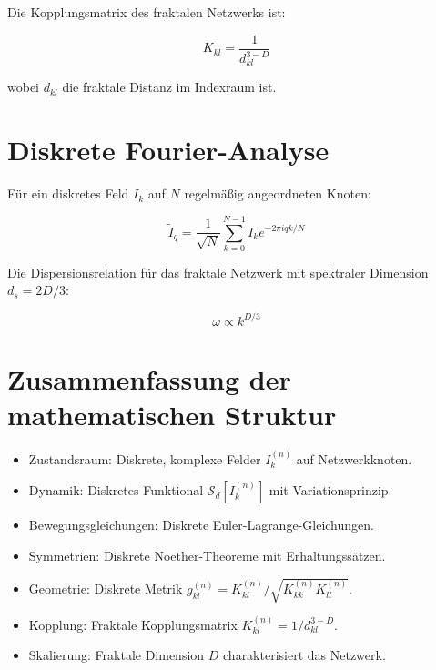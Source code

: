 Die Kopplungsmatrix des fraktalen Netzwerks ist:

\[
K_{kl} = \frac{1}{d_{kl}^{3-D}}
\]

wobei \( d_{kl} \) die fraktale Distanz im Indexraum ist.

\section{Diskrete Fourier-Analyse}

Für ein diskretes Feld \( I_k \) auf \( N \) regelmäßig angeordneten Knoten:

\[
\tilde{I}_q = \frac{1}{\sqrt{N}} \sum_{k=0}^{N-1} I_k e^{-2\pi i q k / N}
\]

Die Dispersionsrelation für das fraktale Netzwerk mit spektraler Dimension \( d_s = 2D/3 \):

\[
\omega \propto k^{D/3}
\]

\section{Zusammenfassung der mathematischen Struktur}

\begin{itemize}
\item Zustandsraum: Diskrete, komplexe Felder \( I_k^{(n)} \) auf Netzwerkknoten.
\item Dynamik: Diskretes Funktional \( \mathcal{S}_d[I_k^{(n)}] \) mit Variationsprinzip.
\item Bewegungsgleichungen: Diskrete Euler-Lagrange-Gleichungen.
\item Symmetrien: Diskrete Noether-Theoreme mit Erhaltungssätzen.
\item Geometrie: Diskrete Metrik \( g_{kl}^{(n)} = K_{kl}^{(n)} / \sqrt{K_{kk}^{(n)} K_{ll}^{(n)}} \).
\item Kopplung: Fraktale Kopplungsmatrix \( K_{kl}^{(n)} = 1/d_{kl}^{3-D} \).
\item Skalierung: Fraktale Dimension \( D \) charakterisiert das Netzwerk.
\end{itemize}